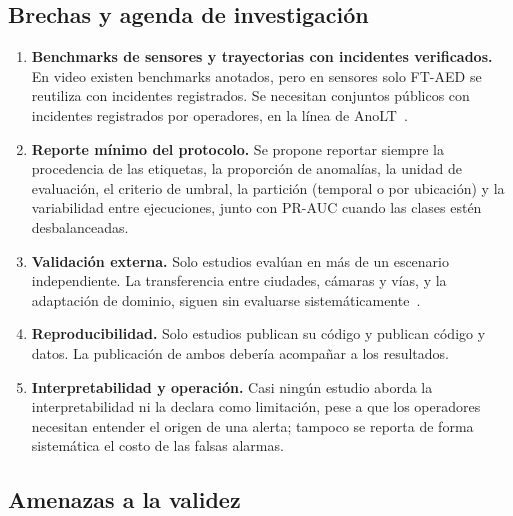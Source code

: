 \documentclass[12pt, a4paper]{article}
\begin{document}
\subsection{Brechas y agenda de investigación}

\begin{enumerate}[label=(\arabic*)]
  \item \textbf{Benchmarks de sensores y trayectorias con incidentes verificados.} En video existen benchmarks anotados, pero en sensores solo FT-AED se reutiliza con incidentes registrados. Se necesitan conjuntos públicos con incidentes registrados por operadores, en la línea de AnoLT~\cite{taheri2026applicability}.
  \item \textbf{Reporte mínimo del protocolo.} Se propone reportar siempre la procedencia de las etiquetas, la proporción de anomalías, la unidad de evaluación, el criterio de umbral, la partición (temporal o por ubicación) y la variabilidad entre ejecuciones, junto con PR-AUC cuando las clases estén desbalanceadas.
  \item \textbf{Validación externa.} Solo \QASeissi{} estudios evalúan en más de un escenario independiente. La transferencia entre ciudades, cámaras y vías, y la adaptación de dominio, siguen sin evaluarse sistemáticamente~\cite{guan2025domain,wu2026feasibility}.
  \item \textbf{Reproducibilidad.} Solo \NcodigoURL{} estudios publican su código y \QACincosi{} publican código y datos. La publicación de ambos debería acompañar a los resultados.
  \item \textbf{Interpretabilidad y operación.} Casi ningún estudio aborda la interpretabilidad ni la declara como limitación, pese a que los operadores necesitan entender el origen de una alerta; tampoco se reporta de forma sistemática el costo de las falsas alarmas.
\end{enumerate}

\subsection{Amenazas a la validez}
\label{sec:amenazas}
\end{document}
